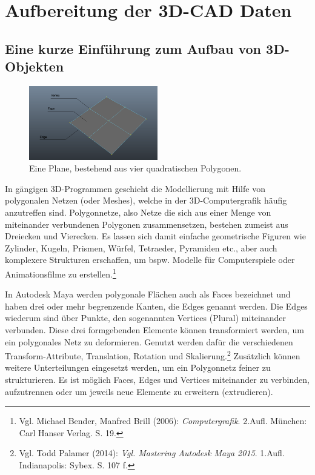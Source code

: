 \chapter{Aufbereitung der 3D-CAD Daten}
\label{sec:AufbereitungDer3D-CADDaten}

\section{Eine kurze Einführung zum Aufbau von 3D-Objekten}
\label{sec:KurzerEinschubZumAufbauVon3D-Objekten}

\begin{figure}
	\centering
	\includegraphics[width=0.5\textwidth]{bildquellen/face_edge_vertex}
	\caption{Eine Plane, bestehend aus vier quadratischen Polygonen.}
\end{figure}
In gängigen 3D-Programmen geschieht die Modellierung mit Hilfe von polygonalen Netzen (oder Meshes), welche in der 3D-Computergrafik häufig anzutreffen sind. Polygonnetze, also Netze die sich aus einer Menge von miteinander verbundenen Polygonen zusammensetzen, bestehen zumeist aus Dreiecken und Vierecken. Es lassen sich damit einfache geometrische Figuren wie Zylinder, Kugeln, Prismen, Würfel, Tetraeder, Pyramiden etc., aber auch komplexere Strukturen erschaffen, um bspw. Modelle für Computerspiele oder Animationsfilme zu erstellen.\footnote{Vgl. Michael Bender, Manfred Brill (2006): \textit{Computergrafik}. 2.Aufl. München: \newline Carl Hanser Verlag. S. 19.}

In Autodesk Maya werden polygonale Flächen auch als Faces bezeichnet und haben drei oder mehr begrenzende Kanten, die Edges genannt werden. Die Edges wiederum sind über Punkte, den sogenannten Vertices (Plural) miteinander verbunden. Diese drei formgebenden Elemente können transformiert werden, um ein polygonales Netz zu deformieren. Genutzt werden dafür die verschiedenen Transform-Attribute, Translation, Rotation und Skalierung.\footnote{Vgl. Todd Palamer (2014): \textit{Vgl. Mastering Autodesk Maya 2015}. 1.Aufl. Indianapolis: Sybex. S. 107 f.} Zusätzlich können weitere Unterteilungen eingesetzt werden, um ein Polygonnetz feiner zu strukturieren. Es ist möglich Faces, Edges und Vertices miteinander zu verbinden, aufzutrennen oder um jeweils neue Elemente zu erweitern (extrudieren). 

